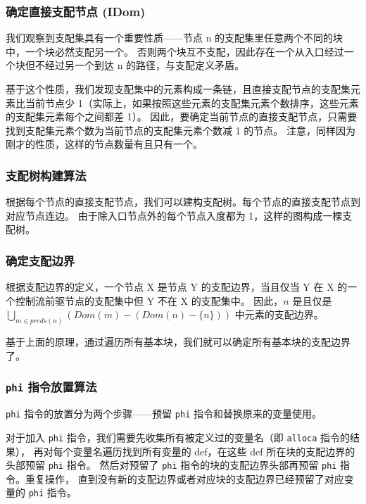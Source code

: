 \subsubsection{确定直接支配节点 (IDom)}

我们观察到支配集具有一个重要性质——节点 n 的支配集里任意两个不同的块中，一个块必然支配另一个。
否则两个块互不支配，因此存在一个从入口经过一个块但不经过另一个到达 n 的路径，与支配定义矛盾。

基于这个性质，我们发现支配集中的元素构成一条链，且直接支配节点的支配集元素比当前节点少
1（实际上，如果按照这些元素的支配集元素个数排序，这些元素的支配集元素每个之间都差 1）。
因此，要确定当前节点的直接支配节点，只需要找到支配集元素个数为当前节点的支配集元素个数减 1 的节点。
注意，同样因为刚才的性质，这样的节点数量有且只有一个。

\subsubsection{支配树构建算法}

根据每个节点的直接支配节点，我们可以建构支配树。每个节点的直接支配节点到对应节点连边。
由于除入口节点外的每个节点入度都为 1，这样的图构成一棵支配树。

\subsubsection{确定支配边界}

根据支配边界的定义，一个节点 X 是节点 Y 的支配边界，当且仅当 Y 在 X 的一个控制流前驱节点的支配集中但 Y 不在 X 的支配集中。
因此，$n$ 是且仅是 $\bigcup_{m\in\mathit{preds}(n)}\left(\mathit{Dom}(m)-(\mathit{Dom}(n)-\{n\})\right)$
中元素的支配边界。

基于上面的原理，通过遍历所有基本块，我们就可以确定所有基本块的支配边界了。

\subsubsection{\texttt{phi} 指令放置算法}

\texttt{phi} 指令的放置分为两个步骤——预留 \texttt{phi} 指令和替换原来的变量使用。

对于加入 \texttt{phi} 指令，我们需要先收集所有被定义过的变量名（即 \texttt{alloca} 指令的结果），
再对每个变量名遍历找到所有变量的 def，在这些 def 所在块的支配边界的头部预留 \texttt{phi} 指令。
然后对预留了 \texttt{phi} 指令的块的支配边界头部再预留 \texttt{phi} 指令。重复操作，
直到没有新的支配边界或者对应块的支配边界已经预留了对应变量的 \texttt{phi} 指令。

